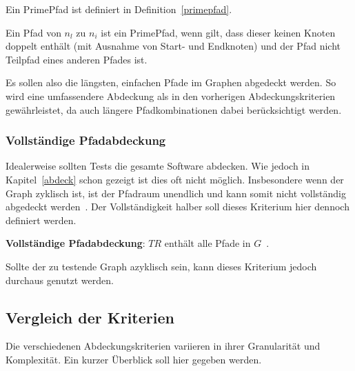 Ein PrimePfad ist definiert in Definition~\ref{primepfad}.

\begin{definition}
    Ein Pfad von $n_{l}$ zu $n_{i}$ ist ein PrimePfad, wenn gilt, dass dieser keinen Knoten doppelt enthält (mit Ausnahme von Start- und Endknoten) und
    der Pfad nicht Teilpfad eines anderen Pfades ist.
    \label{primepfad}
\end{definition}

Es sollen also die längsten, einfachen Pfade im Graphen abgedeckt werden.
So wird eine umfassendere Abdeckung als in den vorherigen Abdeckungskriterien gewährleistet, da auch längere Pfadkombinationen dabei berücksichtigt werden.

\subsubsection{Vollständige Pfadabdeckung}

Idealerweise sollten Tests die gesamte Software abdecken.
Wie jedoch in Kapitel~\ref{abdeck} schon gezeigt ist dies oft nicht möglich.
Insbesondere wenn der Graph zyklisch ist, ist der Pfadraum unendlich und kann somit nicht vollständig abgedeckt werden~\cite[vgl. S. 36 ]{software-testing}.
Der Vollständigkeit halber soll dieses Kriterium hier dennoch definiert werden.

\begin{definition}
    \textbf{Vollständige Pfadabdeckung}: $TR$ enthält alle Pfade in $G$~\cite[vgl. Criterion 2.7]{software-testing}.
    \label{completecov}
\end{definition}

Sollte der zu testende Graph azyklisch sein, kann dieses Kriterium jedoch durchaus genutzt werden.

\subsection{Vergleich der Kriterien}

Die verschiedenen Abdeckungskriterien variieren in ihrer Granularität und Komplexität.
Ein kurzer Überblick soll hier gegeben werden.

